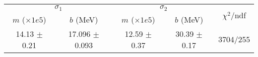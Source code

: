 \begin{tabular}{cc|cc||c}
\multicolumn{2}{c|}{$\sigma_1$} & \multicolumn{2}{|c}{$\sigma_2$}  & \multirow{2}{*}{$\chi^2/$ndf}\\
$m$ ($\times1e5$) & $b$ (MeV) & $m$ ($\times1e5$) & $b$ (MeV)  & \\
\hline
14.13 $\pm$ 0.21 & 17.096 $\pm$ 0.093 & 12.59 $\pm$ 0.37 & 30.39 $\pm$ 0.17 & 3704/255\\
\end{tabular}
